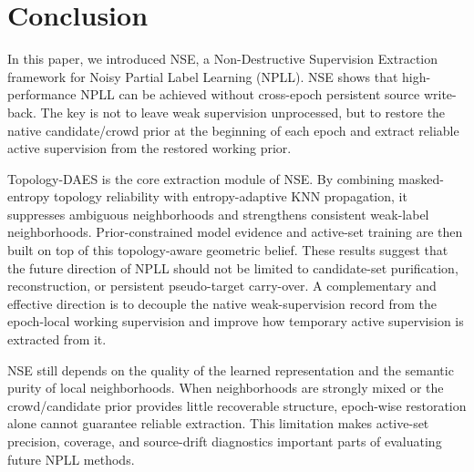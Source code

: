 \section{Conclusion}
\label{sec:conclusion}

In this paper, we introduced NSE, a Non-Destructive Supervision Extraction framework for Noisy Partial Label Learning (NPLL). NSE shows that high-performance NPLL can be achieved without cross-epoch persistent source write-back. The key is not to leave weak supervision unprocessed, but to restore the native candidate/crowd prior at the beginning of each epoch and extract reliable active supervision from the restored working prior.

Topology-DAES is the core extraction module of NSE. By combining masked-entropy topology reliability with entropy-adaptive KNN propagation, it suppresses ambiguous neighborhoods and strengthens consistent weak-label neighborhoods. Prior-constrained model evidence and active-set training are then built on top of this topology-aware geometric belief. These results suggest that the future direction of NPLL should not be limited to candidate-set purification, reconstruction, or persistent pseudo-target carry-over. A complementary and effective direction is to decouple the native weak-supervision record from the epoch-local working supervision and improve how temporary active supervision is extracted from it.

NSE still depends on the quality of the learned representation and the semantic
purity of local neighborhoods. When neighborhoods are strongly mixed or the
crowd/candidate prior provides little recoverable structure, epoch-wise
restoration alone cannot guarantee reliable extraction. This limitation makes
active-set precision, coverage, and source-drift diagnostics important parts of
evaluating future NPLL methods.

